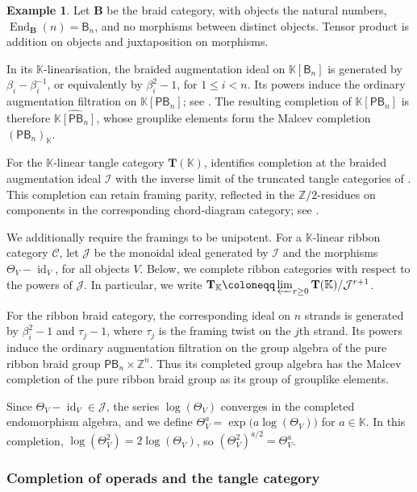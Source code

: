 \documentclass{amsart}
\newcommand{\bT}{\mathbf{T}}
\newcommand{\bB}{\mathbf{B}}
\newcommand{\calC}{\mathcal{C}}
\newcommand{\kk}{\mathbb{K}}    %
\newcommand{\id}{\operatorname{id}}
\newcommand{\End}{\operatorname{End}}
\newcommand{\Br}{\mathsf{B}} %
\newcommand{\PB}{\mathsf{PB}} %
\theoremstyle{definition}
\newtheorem{example}[theorem]{Example}%
\numberwithin{equation}{section}
\begin{document}
\begin{example}
\label{example: completion of braid category}
Let $\bB$ be the braid category, with objects the natural
numbers, $\End_{\bB}(n)=\Br_n$, and no morphisms between
distinct objects. Tensor product is addition on objects
and juxtaposition on morphisms.

In its $\kk$-linearisation, the braided augmentation ideal
on $\kk[\Br_n]$ is generated by $\beta_i-\beta_i^{-1}$,
or equivalently by $\beta_i^2-1$, for $1\leq i<n$.
Its powers induce the ordinary augmentation filtration
on $\kk[\PB_n]$; see
\cite[Lemma~C.1 and Theorem~C.2]{KT_Tangles}.
The resulting completion of $\kk[\PB_n]$ is therefore
$\widehat{\kk[\PB_n]}$, whose grouplike elements form
the Malcev completion $(\PB_n)_{\kk}$.
\end{example}

For the $\kk$-linear tangle category $\bT(\kk)$,
\cite[Theorem~3.6]{KT_Tangles} identifies completion
at the braided augmentation ideal $\mathcal I$ with
the inverse limit of the truncated tangle categories
of \cite[Section~2.2]{KT_Tangles}.
This completion can retain framing parity, reflected
in the $\mathbb Z/2$-residues on components in the
corresponding chord-diagram category;
see \cite[Section~2.3]{KT_Tangles}.

We additionally require the framings to be unipotent.
For a $\kk$-linear ribbon category $\calC$, let
$\mathcal J$ be the monoidal ideal generated by
$\mathcal I$ and the morphisms $\Theta_V-\id_V$,
for all objects $V$. Below, we complete ribbon
categories with respect to the powers of $\mathcal J$.
In particular, we write
$\bT_{\kk}\coloneqq
\varprojlim_{r\geq 0}\bT(\kk)/\mathcal J^{r+1}$.

For the ribbon braid category, the corresponding ideal
on $n$ strands is generated by $\beta_i^2-1$ and
$\tau_j-1$, where $\tau_j$ is the framing twist on
the $j$th strand. Its powers induce the ordinary
augmentation filtration on the group algebra of
the pure ribbon braid group $\PB_n\times\mathbb Z^n$.
Thus its completed group algebra has the Malcev
completion of the pure ribbon braid group as its
group of grouplike elements.

Since $\Theta_V-\id_V\in\mathcal J$, the series
$\log(\Theta_V)$ converges in the completed
endomorphism algebra, and we define
$\Theta_V^a=\exp\bigl(a\log(\Theta_V)\bigr)$
for $a\in\kk$. In this completion,
$\log(\Theta_V^2)=2\log(\Theta_V)$, so
$(\Theta_V^2)^{a/2}=\Theta_V^a$.


\subsubsection{Completion of operads and the tangle category}
\end{document}
